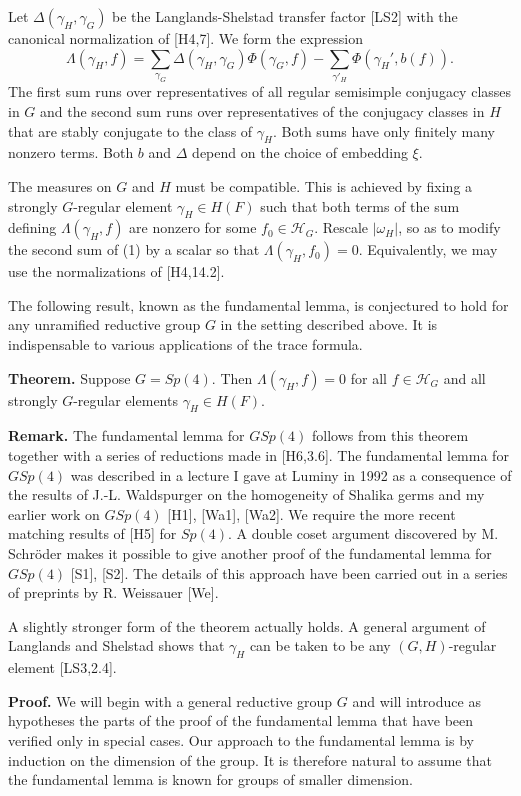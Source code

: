 \documentclass{amsart}
\newcommand\cH{{\mathcal H}}
\begin{document}
Let $\Delta(\gamma_H,\gamma_G)$ be the Langlands-Shelstad transfer
factor [LS2] with the canonical normalization of [H4,7].
We form the expression
\begin{equation}\label{eqn:1}
\Lambda(\gamma_H,f) = \sum_{\gamma_G}\Delta(\gamma_H,\gamma_G)
\Phi(\gamma_G,f) - \sum_{\gamma'_H} \Phi(\gamma_H',b(f)). %
\end{equation}
The first sum runs over representatives of all regular semisimple
conjugacy classes in $G$ and the second sum runs over representatives
of the conjugacy classes in $H$ that are stably conjugate to the class
of $\gamma_H$.  Both sums have only finitely many nonzero terms.  Both
$b$ and $\Delta$ depend on the choice of embedding $\xi$.

The measures on $G$ and $H$ must be compatible. This is achieved by
fixing a strongly $G$-regular element $\gamma_H\in H(F)$ such that
both terms of the sum defining $\Lambda(\gamma_H,f)$ are nonzero for
some $f_0\in \cH_G$.  Rescale $|\omega_H|$, so as to modify the second
sum of (1) by a scalar so that $\Lambda(\gamma_H,f_0)=0$.
Equivalently, we may use the normalizations of [H4,14.2].

The following result, known as the fundamental lemma, is conjectured
to hold for any unramified reductive group $G$ in the setting
described above.  It is indispensable to various applications of the
trace formula.

{\bf Theorem.}  Suppose $G = Sp(4)$.  Then $\Lambda(\gamma_H,f)=0$
for all $f\in \cH_G$ and all strongly $G$-regular elements $\gamma_H\in H(F)$.

{\bf Remark.}  The fundamental lemma for $GSp(4)$ follows from this
theorem together with a series of reductions made in [H6,3.6].  The
fundamental lemma for $GSp(4)$ was described in a lecture I gave at
Luminy in 1992 as a consequence of the results of J.-L.  Waldspurger
on the homogeneity of Shalika germs and my earlier work on $GSp(4)$
[H1], [Wa1], [Wa2].  We require the more recent matching results of
[H5] for $Sp(4)$.  A double coset argument discovered by M. Schr\"oder
makes it possible to give another proof of the fundamental lemma for
$GSp(4)$ [S1], [S2].  The details of this approach have been carried
out in a series of preprints by R. Weissauer [We].

A slightly stronger form of the theorem actually holds.  A general
argument of Langlands and Shelstad shows that $\gamma_H$ can be taken
to be any $(G,H)$-regular element [LS3,2.4].

{\bf Proof.}  We will begin with a general reductive group $G$ and
will introduce as hypotheses the parts of the proof of the fundamental
lemma that have been verified only in special cases.  Our approach to
the fundamental lemma is by induction on the dimension of the group.
It is therefore natural to assume that the fundamental lemma is known
for groups of smaller dimension.
\end{document}

